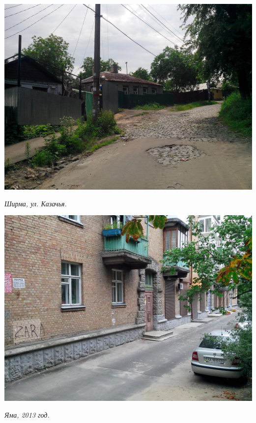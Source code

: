 \begin{center}
\includegraphics[width=\linewidth]{rpix/IMG_20130614_142415.jpg}

\textit{Ширма, ул. Казачья.}
\end{center}


\begin{center}
\includegraphics[width=\linewidth]{rpix/IMG_20130826_173246.jpg}

\textit{Яма, 2013 год.}
\end{center}



